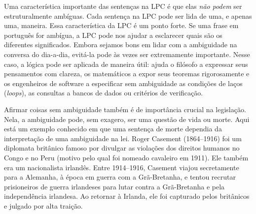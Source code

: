 Uma característica importante das sentenças na LPC é que elas \emph{não podem} ser estruturalmente ambíguas. Cada sentença na LPC pode ser lida de uma, e apenas uma, maneira. Essa característica da LPC é um ponto forte. Se uma frase em português for ambígua, a LPC pode nos ajudar a esclarecer quais são os diferentes significados. Embora sejamos bons em lidar com a ambiguidade na conversa do dia-a-dia, evitá-la pode às vezes ser extremamente importante. Nesse caso, a lógica pode ser aplicada de maneira útil: ajuda o filósofo a expressar seus pensamentos com clareza, os matemáticos a expor seus teoremas rigorosamente e os engenheiros de software a especificar sem ambiguidade as condições de laços (\textit{loops}), as consultas a bancos de dados ou critérios de verificação. 

Afirmar coisas sem ambiguidade também é de importância crucial na legislação. Nela, a ambiguidade pode, sem exagero, ser uma questão de vida ou morte. Aqui está um exemplo conhecido em que uma sentença de morte dependia da interpretação de uma ambiguidade na lei. Roger Casement (1864--1916) foi um diplomata britânico famoso por divulgar as violações dos direitos humanos no Congo e no Peru (motivo pelo qual foi nomeado cavaleiro em 1911). Ele também era um nacionalista irlandês. Entre 1914--1916, Casement viajou secretamente para a Alemanha, à época em guerra com a Grã-Bretanha, e tentou recrutar prisioneiros de guerra irlandeses para lutar contra a Grã-Bretanha e pela independência irlandesa. Ao retornar à Irlanda, ele foi capturado pelos britânicos e julgado por alta traição.

